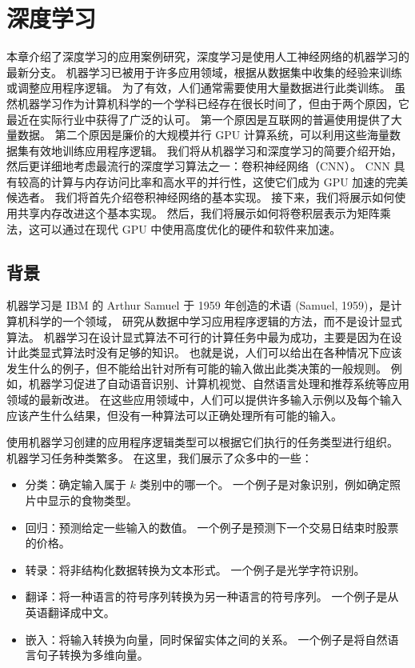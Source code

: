 \section{深度学习}
本章介绍了深度学习的应用案例研究，深度学习是使用人工神经网络的机器学习的最新分支。 
机器学习已被用于许多应用领域，根据从数据集中收集的经验来训练或调整应用程序逻辑。 
为了有效，人们通常需要使用大量数据进行此类训练。 
虽然机器学习作为计算机科学的一个学科已经存在很长时间了，但由于两个原因，它最近在实际行业中获得了广泛的认可。 
第一个原因是互联网的普遍使用提供了大量数据。 
第二个原因是廉价的大规模并行 GPU 计算系统，可以利用这些海量数据集有效地训练应用程序逻辑。 
我们将从机器学习和深度学习的简要介绍开始，然后更详细地考虑最流行的深度学习算法之一：卷积神经网络（CNN）。 
CNN 具有较高的计算与内存访问比率和高水平的并行性，这使它们成为 GPU 加速的完美候选者。 
我们将首先介绍卷积神经网络的基本实现。 接下来，我们将展示如何使用共享内存改进这个基本实现。 
然后，我们将展示如何将卷积层表示为矩阵乘法，这可以通过在现代 GPU 中使用高度优化的硬件和软件来加速。

\subsection{背景}
机器学习是 IBM 的 Arthur Samuel 于 1959 年创造的术语 (Samuel, 1959)，是计算机科学的一个领域，
研究从数据中学习应用程序逻辑的方法，而不是设计显式算法。 
机器学习在设计显式算法不可行的计算任务中最为成功，主要是因为在设计此类显式算法时没有足够的知识。 
也就是说，人们可以给出在各种情况下应该发生什么的例子，但不能给出针对所有可能的输入做出此类决策的一般规则。 
例如，机器学习促进了自动语音识别、计算机视觉、自然语言处理和推荐系统等应用领域的最新改进。 
在这些应用领域中，人们可以提供许多输入示例以及每个输入应该产生什么结果，但没有一种算法可以正确处理所有可能的输入。

使用机器学习创建的应用程序逻辑类型可以根据它们执行的任务类型进行组织。 机器学习任务种类繁多。 
在这里，我们展示了众多中的一些：
\begin{itemize}
   \item 分类：确定输入属于 $k$ 类别中的哪一个。 一个例子是对象识别，例如确定照片中显示的食物类型。

   \item 回归：预测给定一些输入的数值。 一个例子是预测下一个交易日结束时股票的价格。

   \item 转录：将非结构化数据转换为文本形式。 一个例子是光学字符识别。

   \item 翻译：将一种语言的符号序列转换为另一种语言的符号序列。 一个例子是从英语翻译成中文。

   \item 嵌入：将输入转换为向量，同时保留实体之间的关系。 一个例子是将自然语言句子转换为多维向量。

\end{itemize}

